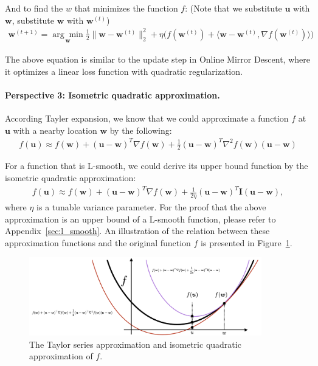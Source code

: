 \documentclass[11pt]{article}
\newcommand{\bw}{\boldsymbol{w}}
\newcommand{\bu}{\boldsymbol{u}}
\begin{document}
And to find the $w$ that minimizes the function $f$: (Note that we substitute $\bu$ with $\bw$, substitute $\bw$ with $\bw^{(t)}$)
\begin{equation*}
\begin{split}
\bw^{(t+1)} = 
\underset{\bw}{\arg\min} \frac{1}{2} \| \bw - \bw^{(t)} \|_2^2 
+ \eta\Big(f(\bw^{(t)}) + \langle \bw-\bw^{(t)}, \nabla f(\bw^{(t)}) \rangle \Big)
\end{split}
\end{equation*}

The above equation is similar to the update step in Online Mirror Descent, where it optimizes a linear loss function with quadratic regularization.

\paragraph{Perspective 3: Isometric quadratic approximation.}

According Tayler expansion, we know that we could approximate a function $f$ at $\bu$ with a nearby location $\bw$ by the following:
\begin{equation*}
\begin{split}
f(\bu) \approx f(\bw) + (\bu-\bw)^T \nabla f(\bw) + \frac{1}{2} (\bu-\bw)^T \nabla^2 f(\bw) (\bu-\bw)
\end{split}
\end{equation*}

For a function that is L-smooth, we could derive its upper bound function by the isometric quadratic approximation:
\begin{equation*}
\begin{split}
f(\bu) \approx f(\bw) + (\bu-\bw)^T \nabla f(\bw) + \frac{1}{2\eta} (\bu-\bw)^T \boldsymbol{I} (\bu-\bw),
\end{split}
\end{equation*}
where $\eta$ is a tunable variance parameter. For the proof that the above approximation is an upper bound of a L-smooth function, please refer to Appendix~\ref{sec:l_smooth}.
An illustration of the relation between these approximation functions and the original function $f$ is presented in Figure~\ref{fig:GD_iso_quad}. 

\begin{figure}[H]
    \centering
    \includegraphics[width=0.9\textwidth]{Img/GD_iso_quad.png}
    \caption{The Taylor series approximation and isometric quadratic approximation of $f$.}
    \label{fig:GD_iso_quad}
\end{figure}
\end{document}
